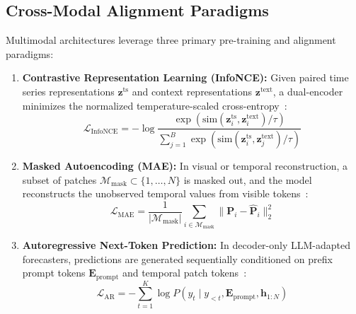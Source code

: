 \subsection{Cross-Modal Alignment Paradigms}
Multimodal architectures leverage three primary pre-training and alignment paradigms:
\begin{enumerate}
    \item \textbf{Contrastive Representation Learning (InfoNCE):} Given paired time series representations $\mathbf{z}^{\text{ts}}$ and context representations $\mathbf{z}^{\text{text}}$, a dual-encoder minimizes the normalized temperature-scaled cross-entropy~\cite{Sun2023TEST,Chen2025TRACE}:
    \begin{equation}
    \mathcal{L}_{\text{InfoNCE}} = -\log \frac{\exp(\text{sim}(\mathbf{z}_i^{\text{ts}}, \mathbf{z}_i^{\text{text}}) / \tau)}{\sum_{j=1}^B \exp(\text{sim}(\mathbf{z}_i^{\text{ts}}, \mathbf{z}_j^{\text{text}}) / \tau)}
    \label{eq:infonce}
    \end{equation}
    \item \textbf{Masked Autoencoding (MAE):} In visual or temporal reconstruction, a subset of patches $\mathcal{M}_{\text{mask}} \subset \{1, \dots, N\}$ is masked out, and the model reconstructs the unobserved temporal values from visible tokens~\cite{Chen2024VisionTS}:
    \begin{equation}
    \mathcal{L}_{\text{MAE}} = \frac{1}{|\mathcal{M}_{\text{mask}}|} \sum_{i \in \mathcal{M}_{\text{mask}}} \|\mathbf{P}_i - \hat{\mathbf{P}}_i\|_2^2
    \end{equation}
    \item \textbf{Autoregressive Next-Token Prediction:} In decoder-only LLM-adapted forecasters, predictions are generated sequentially conditioned on prefix prompt tokens $\mathbf{E}_{\text{prompt}}$ and temporal patch tokens~\cite{Liu2024AutoTimes,Zhao2024ChatTS}:
    \begin{equation}
    \mathcal{L}_{\text{AR}} = -\sum_{t=1}^K \log P(y_t \mid y_{<t}, \mathbf{E}_{\text{prompt}}, \mathbf{h}_{1:N})
    \end{equation}
\end{enumerate}
